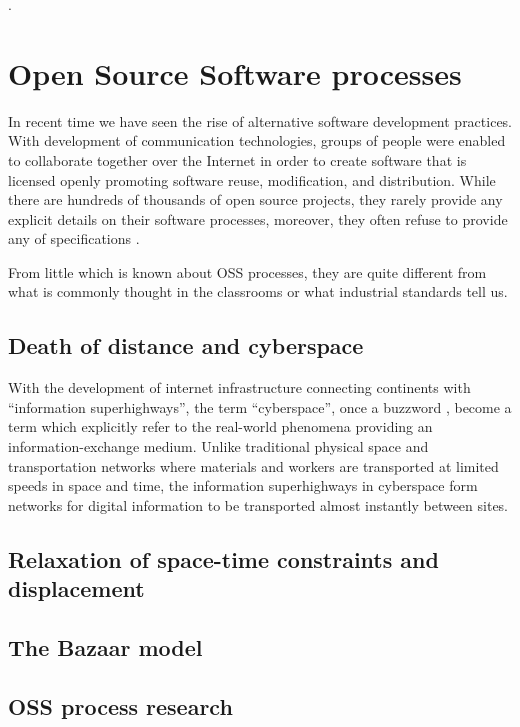 .

\section{Open Source Software processes}\label{oss.processes}
In recent time we have seen the rise of alternative software development practices. 
With development of communication technologies, groups of people were 
enabled to collaborate together over the Internet in order to create software that is 
licensed openly promoting software reuse, modification, and distribution. While there are 
hundreds of thousands of open source projects, they rarely provide any explicit details on 
their software processes, moreover, they often refuse to provide any of 
specifications \cite{Torvalds:2005}. 

From little which is known about OSS processes, they are quite different from what is 
commonly thought in the classrooms or what industrial standards tell us.

\subsection{Death of distance and cyberspace}
With the development of internet infrastructure connecting continents with ``information
superhighways'', the term ``cyberspace'', once a buzzword \cite{citeulike:11095763}, become 
a term which explicitly refer to the real-world phenomena providing an information-exchange
medium. Unlike traditional physical space and transportation networks where materials
and workers are transported at limited speeds in space and time, the information superhighways
in cyberspace form networks for digital information to be transported almost instantly 
between sites.


\subsection{Relaxation of space-time constraints and displacement}
\subsection{The Bazaar model}
\subsection{OSS process research}
